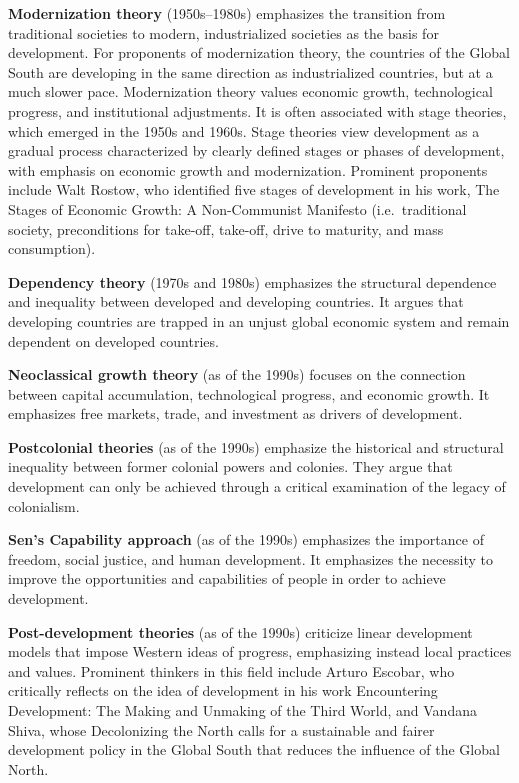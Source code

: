 \documentclass[
  a4paper,
  openany]{book}
\begin{document}
\begin{tcolorbox}[enhanced jigsaw, coltitle=black, bottomtitle=1mm, opacitybacktitle=0.6, titlerule=0mm, opacityback=0, leftrule=.75mm, colbacktitle=quarto-callout-note-color!10!white, bottomrule=.15mm, toptitle=1mm, breakable, title={Development theories}, arc=.35mm, rightrule=.15mm, toprule=.15mm, left=2mm, colback=white, colframe=quarto-callout-note-color-frame]

\textbf{Modernization theory} (1950s--1980s) emphasizes the transition
from traditional societies to modern, industrialized societies as the
basis for development. For proponents of modernization theory, the
countries of the Global South are developing in the same direction as
industrialized countries, but at a much slower pace. Modernization
theory values economic growth, technological progress, and institutional
adjustments. It is often associated with stage theories, which emerged
in the 1950s and 1960s. Stage theories view development as a gradual
process characterized by clearly defined stages or phases of
development, with emphasis on economic growth and modernization.
Prominent proponents include Walt Rostow, who identified five stages of
development in his work, The Stages of Economic Growth: A Non-Communist
Manifesto (i.e.~traditional society, preconditions for take-off,
take-off, drive to maturity, and mass consumption).

\textbf{Dependency theory} (1970s and 1980s) emphasizes the structural
dependence and inequality between developed and developing countries. It
argues that developing countries are trapped in an unjust global
economic system and remain dependent on developed countries.

\textbf{Neoclassical growth theory} (as of the 1990s) focuses on the
connection between capital accumulation, technological progress, and
economic growth. It emphasizes free markets, trade, and investment as
drivers of development.

\textbf{Postcolonial theories} (as of the 1990s) emphasize the
historical and structural inequality between former colonial powers and
colonies. They argue that development can only be achieved through a
critical examination of the legacy of colonialism.

\textbf{Sen's Capability approach} (as of the 1990s) emphasizes the
importance of freedom, social justice, and human development. It
emphasizes the necessity to improve the opportunities and capabilities
of people in order to achieve development.

\textbf{Post-development theories} (as of the 1990s) criticize linear
development models that impose Western ideas of progress, emphasizing
instead local practices and values. Prominent thinkers in this field
include Arturo Escobar, who critically reflects on the idea of
development in his work Encountering Development: The Making and
Unmaking of the Third World, and Vandana Shiva, whose Decolonizing the
North calls for a sustainable and fairer development policy in the
Global South that reduces the influence of the Global North.

\end{tcolorbox}
\end{document}
